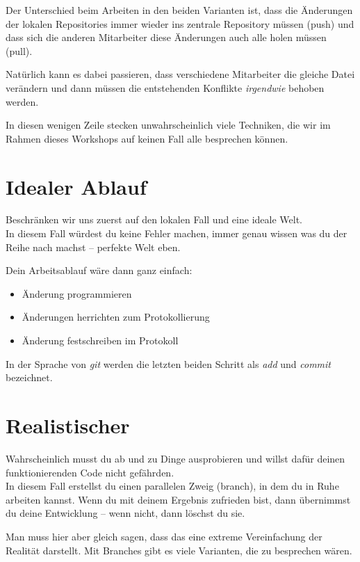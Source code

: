 \documentclass[
  letterpaper,
  DIV=11]{scrreprt}
\providecommand{\tightlist}{%
  \setlength{\itemsep}{0pt}\setlength{\parskip}{0pt}}\usepackage{longtable,booktabs,array}
\newcommand{\git}{\textit{git}\xspace}
\begin{document}
Der Unterschied beim Arbeiten in den beiden Varianten ist, dass die
Änderungen der lokalen Repositories immer wieder ins zentrale Repository
müssen (push) und\\
dass sich die anderen Mitarbeiter diese Änderungen auch alle holen
müssen (pull).

Natürlich kann es dabei passieren, dass verschiedene Mitarbeiter die
gleiche Datei verändern und dann müssen die entstehenden Konflikte
\emph{irgendwie} behoben werden.

In diesen wenigen Zeile stecken unwahrscheinlich viele Techniken, die
wir im Rahmen dieses Workshops auf keinen Fall alle besprechen können.

\section{Idealer Ablauf}\label{idealer-ablauf}

Beschränken wir uns zuerst auf den lokalen Fall und eine ideale Welt.\\
In diesem Fall würdest du keine Fehler machen, immer genau wissen was du
der Reihe nach machst -- perfekte Welt eben.

Dein Arbeitsablauf wäre dann ganz einfach:

\begin{itemize}
\tightlist
\item
  Änderung programmieren
\item
  Änderungen herrichten zum Protokollierung
\item
  Änderung festschreiben im Protokoll
\end{itemize}

In der Sprache von \git werden die letzten beiden Schritt als \emph{add}
und \emph{commit} bezeichnet.

\section{Realistischer}\label{realistischer}

Wahrscheinlich musst du ab und zu Dinge ausprobieren und willst dafür
deinen funktionierenden Code nicht gefährden.\\
In diesem Fall erstellst du einen parallelen Zweig (branch), in dem du
in Ruhe arbeiten kannst. Wenn du mit deinem Ergebnis zufrieden bist,
dann übernimmst du deine Entwicklung -- wenn nicht, dann löschst du sie.

Man muss hier aber gleich sagen, dass das eine extreme Vereinfachung der
Realität darstellt. Mit Branches gibt es viele Varianten, die zu
besprechen wären.
\end{document}
